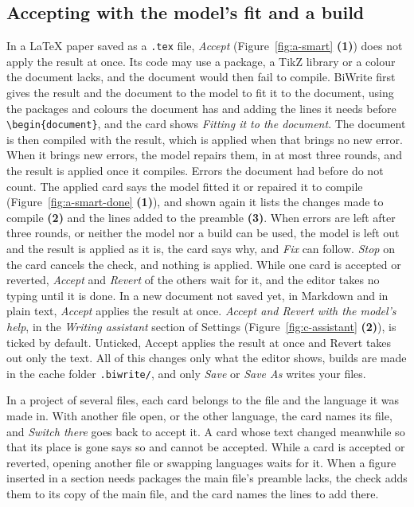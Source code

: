 \documentclass[a4paper,11pt]{article}
\newcommand{\ui}[1]{\emph{#1}}
\newcommand{\n}[1]{\textbf{(#1)}}
\newcommand{\fig}[1]{Figure~\ref{fig:#1}}
\begin{document}
\subsection{Accepting with the model's fit and a build}
In a LaTeX paper saved as a \texttt{.tex} file, \ui{Accept} (\fig{a-smart} \n{1}) does not apply the result at once. Its code may use a package, a TikZ library or a colour the document lacks, and the document would then fail to compile. BiWrite first gives the result and the document to the model to fit it to the document, using the packages and colours the document has and adding the lines it needs before \texttt{\textbackslash begin\{document\}}, and the card shows \ui{Fitting it to the document}. The document is then compiled with the result, which is applied when that brings no new error. When it brings new errors, the model repairs them, in at most three rounds, and the result is applied once it compiles. Errors the document had before do not count. The applied card says the model fitted it or repaired it to compile (\fig{a-smart-done} \n{1}), and shown again it lists the changes made to compile \n{2} and the lines added to the preamble \n{3}. When errors are left after three rounds, or neither the model nor a build can be used, the model is left out and the result is applied as it is, the card says why, and \ui{Fix} can follow. \ui{Stop} on the card cancels the check, and nothing is applied. While one card is accepted or reverted, \ui{Accept} and \ui{Revert} of the others wait for it, and the editor takes no typing until it is done. In a new document not saved yet, in Markdown and in plain text, \ui{Accept} applies the result at once. \ui{Accept and Revert with the model's help}, in the \ui{Writing assistant} section of Settings (\fig{c-assistant} \n{2}), is ticked by default. Unticked, Accept applies the result at once and Revert takes out only the text. All of this changes only what the editor shows, builds are made in the cache folder \texttt{.biwrite/}, and only \ui{Save} or \ui{Save As} writes your files.

In a project of several files, each card belongs to the file and the language it was made in. With another file open, or the other language, the card names its file, and \ui{Switch there} goes back to accept it. A card whose text changed meanwhile so that its place is gone says so and cannot be accepted. While a card is accepted or reverted, opening another file or swapping languages waits for it. When a figure inserted in a section needs packages the main file's preamble lacks, the check adds them to its copy of the main file, and the card names the lines to add there.
\end{document}
